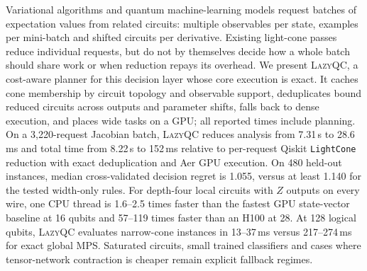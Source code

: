 Variational algorithms and quantum machine-learning models request batches of expectation values from related circuits: multiple observables per state, examples per mini-batch and shifted circuits per derivative. Existing light-cone passes reduce individual requests, but do not by themselves decide how a whole batch should share work or when reduction repays its overhead. We present \textsc{LazyQC}, a cost-aware planner for this decision layer whose core execution is exact. It caches cone membership by circuit topology and observable support, deduplicates bound reduced circuits across outputs and parameter shifts, falls back to dense execution, and places wide tasks on a GPU; all reported times include planning. On a 3,220-request Jacobian batch, \textsc{LazyQC} reduces analysis from 7.31\,s to 28.6\,ms and total time from 8.22\,s to 152\,ms relative to per-request Qiskit \texttt{LightCone} reduction with exact deduplication and Aer GPU execution. On 480 held-out instances, median cross-validated decision regret is 1.055, versus at least 1.140 for the tested width-only rules. For depth-four local circuits with $Z$ outputs on every wire, one CPU thread is 1.6--2.5 times faster than the fastest GPU state-vector baseline at 16 qubits and 57--119 times faster than an H100 at 28. At 128 logical qubits, \textsc{LazyQC} evaluates narrow-cone instances in 13--37\,ms versus 217--274\,ms for exact global MPS. Saturated circuits, small trained classifiers and cases where tensor-network contraction is cheaper remain explicit fallback regimes.
